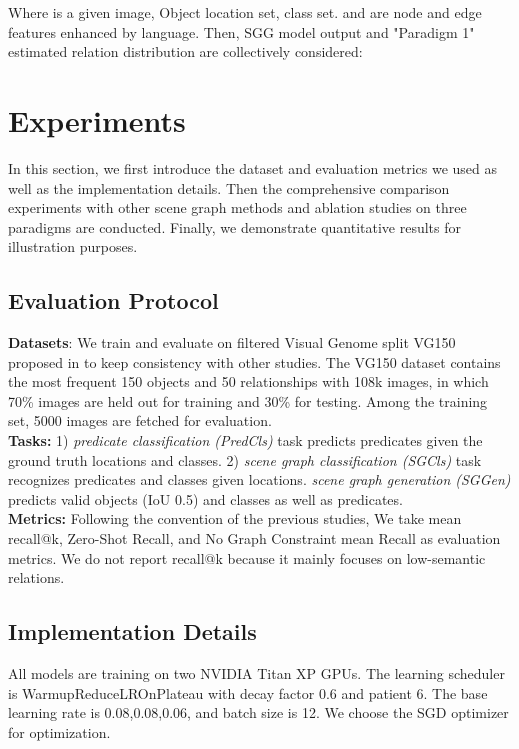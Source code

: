 \documentclass[runningheads]{llncs}
\begin{document}
Where  is a given image, Object location set, class set.
 and  are node and edge features enhanced by language. Then,
SGG model output and "Paradigm 1" estimated relation distribution  are collectively considered:

\section{Experiments}
\label{experiments}
In this section, we first introduce the dataset and evaluation metrics we used
as well as the implementation details. Then the comprehensive comparison
experiments with other scene graph methods and ablation studies on three
paradigms are conducted. Finally, we demonstrate quantitative results for
illustration purposes.
\subsection{Evaluation Protocol}
\textbf{Datasets}:  We train and evaluate on filtered Visual Genome split VG150
proposed in\cite{imp} to keep consistency with other studies. The VG150 dataset
contains the most frequent 150 objects and 50 relationships with 108k images,
in which 70\% images are held out for training and 30\% for testing. Among the
training set, 5000 images are fetched for evaluation.\\

\noindent\textbf{Tasks:} 1) \textit{predicate classification (PredCls)}  task
predicts predicates given the ground truth locations and classes. 2)
\textit{scene graph classification (SGCls)} task recognizes predicates and
classes given locations.  \textit{scene graph generation (SGGen)} predicts
valid objects (IoU  0.5) and classes as well as predicates.\\

\noindent\textbf{Metrics:} Following the convention of the previous studies, We
take mean  recall@k, Zero-Shot Recall\cite{lp}, and No Graph Constraint mean
Recall\cite{pixels} as evaluation metrics. We do not report
recall@k\cite{vctree} because it mainly focuses on low-semantic relations.
\subsection{Implementation Details}
All models are training on two NVIDIA Titan XP GPUs. The learning scheduler is
WarmupReduceLROnPlateau with decay factor 0.6 and patient 6. The base learning
rate is 0.08,0.08,0.06, and batch size is 12. We choose the SGD optimizer for
optimization.\\
\end{document}
